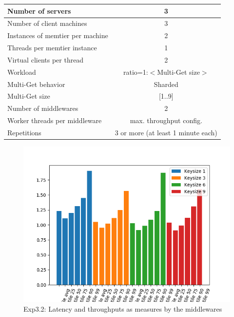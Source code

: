 \documentclass[11pt,a4paper]{article}
\begin{document}
\begin{center}
	\scriptsize{
		\begin{tabular}{|l|c|}
			\hline Number of servers                & 3                       \\ 
			\hline Number of client machines        & 3                       \\ 
			\hline Instances of memtier per machine & 2                       \\ 
			\hline Threads per memtier instance     & 1                       \\
			\hline Virtual clients per thread       & 2     		            \\ 
			\hline Workload                         & ratio=1:$<$Multi-Get size$>$             \\
			\hline Multi-Get behavior               & Sharded                 \\
			\hline Multi-Get size                   & [1..9]                  \\
			\hline Number of middlewares            & 2                       \\
			\hline Worker threads per middleware    & max. throughput config. \\
			\hline Repetitions                      & 3 or more (at least 1 minute each)               \\ 
			\hline 
		\end{tabular}
	} 
\end{center}

\begin{figure}[H]
\centering
\includegraphics[width=\textwidth]{img/exp5_1/exp5_1_percentile_plots_sharded_True.png}
\caption{Exp3.2: Latency and throughputs as measures by the middlewares}
\label{fig:test}
\end{figure}
\end{document}
